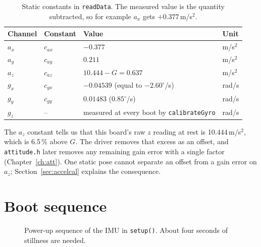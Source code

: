 \documentclass[11pt,a4paper]{report}
\newcommand{\code}[1]{\texttt{#1}}
\begin{document}
\begin{table}[H]
\centering
\caption{Static constants in \code{readData}. The measured value is the quantity subtracted, so for example $a_x$ gets $+0.377$\,m/s$^2$.}\label{tab:offsets}
\small
\begin{tabular}{@{}llll@{}}
\toprule
Channel & Constant & Value & Unit\\
\midrule
$a_x$ & $c_{ax}$ & $-0.377$ & m/s$^2$\\
$a_y$ & $c_{ay}$ & $0.211$ & m/s$^2$\\
$a_z$ & $c_{az}$ & $10.444-G=0.637$ & m/s$^2$\\
$g_x$ & $c_{gx}$ & $-0.04539$ (equal to $-2.60^\circ$/s) & rad/s\\
$g_y$ & $c_{gy}$ & $0.01483$ ($0.85^\circ$/s) & rad/s\\
$g_z$ & -- & measured at every boot by \code{calibrateGyro} & rad/s\\
\bottomrule
\end{tabular}
\end{table}

The $a_z$ constant tells us that this board's raw $z$ reading at rest is 10.444\,m/s$^2$, which is 6.5\,\% above $G$. The driver removes that excess as an offset, and \code{attitude.h} later removes any remaining gain error with a single factor (Chapter~\ref{ch:att}). One static pose cannot separate an offset from a gain error on $a_z$; Section~\ref{sec:accelcal} explains the consequence.

\section{Boot sequence}
\begin{figure}[H]
\centering
{}
\caption{Power-up sequence of the IMU in \code{setup()}. About four seconds of stillness are needed.}\label{fig:boot}
\end{figure}
\end{document}
